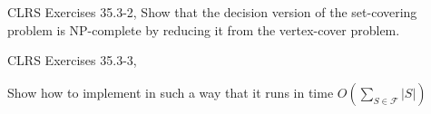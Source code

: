 

\usepackage{clrscode}
\usepackage{enumerate}
\newcommand{\hmwkTitle}{Assignment\ \#7} %
\newcommand{\hmwkDueDate}{April\ 30,\ 2016} %
\newcommand{\hmwkClass}{Algorithms} %
\newcommand{\hmwkAuthorName}{Zhaoyang Li (2014013432)} %



\maketitle


\setcounter{tocdepth}{1} %

\newpage
\tableofcontents
\newpage



\begin{homeworkProblem}

CLRS Exercises 35.3-2,
Show that the decision version of the set-covering problem is NP-complete by reducing it from the vertex-cover problem.

\problemAnswer{


}
\end{homeworkProblem}




\begin{homeworkProblem}

CLRS Exercises 35.3-3,

Show how to implement  in such a way that it runs in time $O\left(\sum_{S\in \mathcal{F}}|S|\right)$


\problemAnswer{
}
\end{homeworkProblem}




